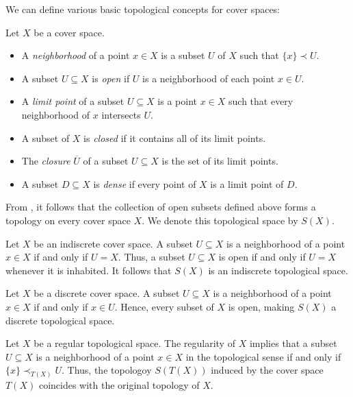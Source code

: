 \documentclass[pdflatex,sn-mathphys-num]{sn-jnl}
\theoremstyle{definition}
\theoremstyle{remark}
\numberwithin{figure}{section}
\newcommand{\rb}{\prec}
\begin{document}
We can define various basic topological concepts for cover spaces:

\begin{defn}
Let $X$ be a cover space.
\begin{itemize}
\item A \emph{neighborhood} of a point $x \in X$ is a subset $U$ of $X$ such that $\{ x \} \rb U$.
\item A subset $U \subseteq X$ is \emph{open} if $U$ is a neighborhood of each point $x \in U$.
\item A \emph{limit point} of a subset $U \subseteq X$ is a point $x \in X$ such that every neighborhood of $x$ intersects $U$.
\item A subset of $X$ is \emph{closed} if it contains all of its limit points.
\item The \emph{closure} $\overline{U}$ of a subset $U \subseteq X$ is the set of its limit points.
\item A subset $D \subseteq X$ is \emph{dense} if every point of $X$ is a limit point of $D$.
\end{itemize}
\end{defn}

From , it follows that the collection of open subsets defined above forms a topology on every cover space $X$.
We denote this topological space by $S(X)$.

\begin{example}
Let $X$ be an indiscrete cover space.
A subset $U \subseteq X$ is a neighborhood of a point $x \in X$ if and only if $U = X$.
Thus, a subset $U \subseteq X$ is open if and only if $U = X$ whenever it is inhabited.
It follows that $S(X)$ is an indiscrete topological space.
\end{example}

\begin{example}
Let $X$ be a discrete cover space.
A subset $U \subseteq X$ is a neighborhood of a point $x \in X$ if and only if $x \in U$.
Hence, every subset of $X$ is open, making $S(X)$ a discrete topological space.
\end{example}

\begin{example}
Let $X$ be a regular topological space.
The regularity of $X$ implies that a subset $U \subseteq X$ is a neighborhood of a point $x \in X$ in the topological sense if and only if $\{ x \} \rb_{T(X)} U$.
Thus, the topologoy $S(T(X))$ induced by the cover space $T(X)$ coincides with the original topology of $X$.
\end{example}
\end{document}
